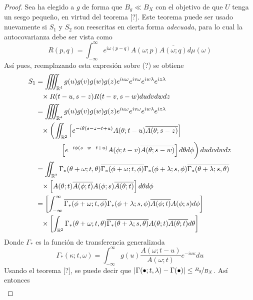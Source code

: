 \documentclass[12pt,letterpaper]{book}
\newcommand{\R}{\mathbb{R}}
\newcommand{\intR}{\int_{-\infty}^{\infty}}
\newcommand{\abso}[1]{\left| #1 \right|}
\newcommand{\pheq}{\phantom{=}}
\begin{document}
\begin{proof}
Sea ha elegido a $g$ de forma que $B_g \ll B_X$ con el objetivo de que $U$ tenga un sesgo pequeño, en virtud del teorema [?]. Este teorema puede ser usado nuevamente si $S_1$ y $S_2$ son reescritas en cierta forma \textit{adecuada}, para lo cual la autocovarianza debe ser vista como
\begin{equation}
R(p,q) = \intR e^{i \omega (p-q)} A(\omega; p)\overline{A(\omega; q)} d\mu(\omega) 
\end{equation}
Así pues, reemplazando esta expresión sobre (?) se obtiene
\begin{align*}
S_1 &=
\iiiint_{\R^{4}} g(u) g(v) g(w) g(z) e^{i u \omega} e^{i v \omega} e^{i w \lambda} e^{i z \lambda} \\
&\pheq \times R(t-u,s-z)R(t-v,s-w) du dv dw dz \\
&= 
\iiiint_{\R^{4}} g(u) g(v) g(w) g(z) e^{i u \omega} e^{i v \omega} e^{i w \lambda} e^{i z \lambda} \\
&\pheq \times \left( 
\iint_{\R^{2}} 
\left[ 
e^{-i \theta (s-z-t+u)} A(\theta; t-u) \overline{A(\theta; s-z)} 
\right] 
\right. \\
&\pheq 
\left. \vphantom{\int} \phantom{times}
\left[ e^{-i \phi (s-w-t+u)} A(\phi; t-v) \overline{A(\theta; s-w)} \right] d\theta d\phi
\right) du dv dw dz
\\
 &= \iint_{\R^{2}} \Gamma_*(\theta+ \omega; t, \theta) \overline{\Gamma_*(\phi + \omega; t, \phi)}
 \Gamma_*(\phi+ \lambda; s, \phi) \overline{\Gamma_*(\theta + \lambda; s, \theta)} \\
 &\pheq \times
 \left[
 A(\theta; t) \overline{A(\phi; t)} A(\phi; s) \overline{A(\theta; t)}
 \right] d\theta d\phi
\\
 &= \left[ \intR \overline{\Gamma_*(\phi + \omega; t, \phi)} \Gamma_*(\phi+ \lambda; s, \phi)
 \overline{A(\phi; t)} A(\phi; s) d\phi \right] \\
 &\pheq \times \left[ \int_{\R^{2}} \Gamma_*(\theta+ \omega; t, \theta) 
  \overline{\Gamma_*(\theta + \lambda; s, \theta)}  
 A(\theta; t)   \overline{A(\theta; t)} d\theta \right] 
\end{align*}
Donde $\Gamma_*$ es la función de transferencia generalizada
\begin{equation}
\Gamma_*(\kappa; t, \omega) = \intR g(u) \frac{A(\omega; t-u)}{A(\omega; t)} e^{-i u \kappa} du
\end{equation}
Usando el teorema [?], se puede decir que $\abso{\Gamma(\bullet; t, \lambda) - \Gamma(\bullet)} \leq \nicefrac{B_g}{B_X}$. Así entonces
\begin{align*}

\end{align*}
\end{proof}
\end{document}
